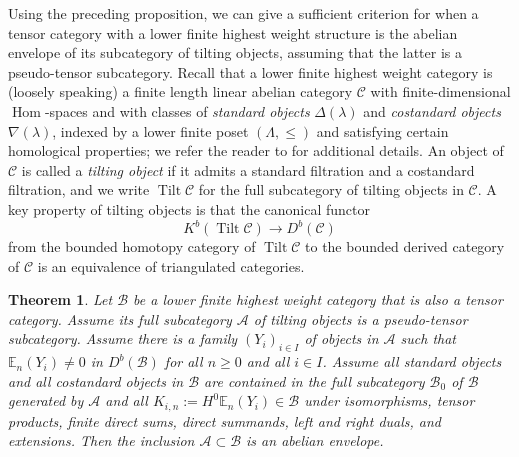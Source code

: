 \documentclass[11pt,oneside]{amsart}
\newtheorem{theorem}{Theorem}[section]
\theoremstyle{definition}
\theoremstyle{remark}
\newcommand\EE{\mathbb E}
\newcommand\cA{\mathcal A}
\newcommand\cB{\mathcal B}
\newcommand\cC{\mathcal C}
\newcommand\Hom{\operatorname{Hom}}
\newcommand\Tilt{\operatorname{Tilt}}
\renewcommand\:\colon
\begin{document}
Using the preceding proposition, we can give a sufficient criterion for when a tensor category with a lower finite highest weight structure is the abelian envelope of its subcategory of tilting objects, assuming that the latter is a pseudo-tensor subcategory.
Recall that a lower finite highest weight category is (loosely speaking) a finite length linear abelian category $\cC$ with finite-dimensional $\Hom$-spaces and with classes of \emph{standard objects} $\Delta(\lambda)$ and \emph{costandard objects} $\nabla(\lambda)$, indexed by a lower finite poset $(\Lambda,\leq)$ and satisfying certain homological properties; we refer the reader to \cite{BS} for additional details.
An object of $\cC$ is called a \emph{tilting object} if it admits a standard filtration and a costandard filtration, and we write $\Tilt\cC$ for the full subcategory of tilting objects in $\cC$.
A key property of tilting objects is that the canonical functor
\begin{equation}
\label{eq:tilting-equiv}
    K^b( \Tilt\cC ) \longrightarrow D^b( \cC )
\end{equation}
from the bounded homotopy category of $\Tilt\cC$ to the bounded derived category of $\cC$ is an equivalence of triangulated categories.

\begin{theorem} \label{thm:main-general} Let $\cB$ be a lower finite highest weight category that is also a tensor category. Assume its full subcategory $\cA$ of tilting objects is a pseudo-tensor subcategory. Assume there is a family $(Y_i)_{i\in I}$ of objects in $\cA$ such that $\EE_n(Y_i)\neq0$ in $D^b(\cB)$ for all $n\ge0$ and all $i\in I$. Assume all standard objects and all costandard objects in $\cB$ are contained in the full subcategory $\cB_0$ of $\cB$ generated by $\cA$ and all $K_{i,n}:=H^0\EE_n(Y_i)\in\cB$ under isomorphisms, tensor products, finite direct sums, direct summands, left and right duals, and extensions. Then the inclusion $\cA\subset\cB$ is an abelian envelope.
\end{theorem}
\end{document}
